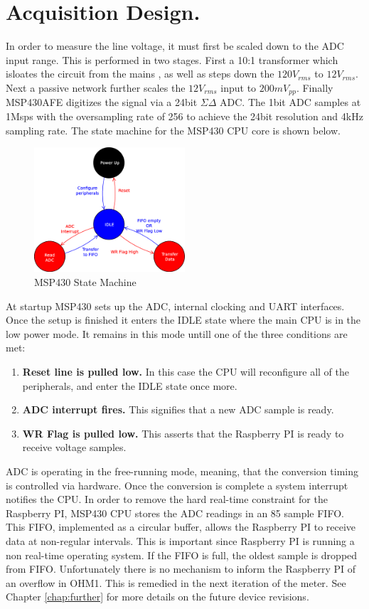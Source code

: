 \section{Acquisition Design.}
In order to measure the line voltage, it must first be scaled down to the ADC input range. This is performed in two stages. First a 10:1 transformer which isloates the circuit from the mains
, as well as steps down the $120V_{rms}$ to $12V_{rms}$. Next a passive network further scales the $12V_{rms}$ input to $200mV_{pp}$. Finally MSP430AFE digitizes the signal via a 24bit $\Sigma\Delta$
ADC. The 1bit ADC samples at 1Msps with the oversampling rate of 256 to achieve the 24bit resolution and 4kHz sampling rate. The state machine for the MSP430 CPU core is shown below.
\begin{figure}[h!]
\centering
\includegraphics[width=0.5\textwidth]{img/MSP430StateMachine.eps}
\caption{MSP430 State Machine}
\end{figure}

	At startup MSP430 sets up the ADC, internal clocking and UART interfaces. Once the setup is finished it enters the IDLE state where the main CPU is in the low power mode. It remains in this mode
untill one of the three conditions are met:
\begin{enumerate}
\item \textbf{Reset line is pulled low.} In this case the CPU will reconfigure all of the peripherals, and enter the IDLE state once more.
\item \textbf{ADC interrupt fires.} This signifies that a new ADC sample is ready.
\item \textbf{WR Flag is pulled low.} This asserts that the Raspberry PI is ready to receive voltage samples.
\end{enumerate}
	
ADC is operating in the free-running mode, meaning, that the conversion timing is controlled via hardware. Once the conversion is complete a system interrupt notifies the CPU.
In order to remove the hard real-time constraint for the Raspberry PI, MSP430 CPU stores the ADC readings in an 85 sample FIFO. This FIFO, implemented as a circular buffer, 
allows the Raspberry PI to receive data at non-regular intervals. This is important since Raspberry PI is running a non real-time operating system. If the FIFO is full, the oldest sample
is dropped from FIFO. Unfortunately there is no mechanism to inform the Raspberry PI of an overflow in OHM1. This is remedied in the next iteration of the meter. See Chapter \ref{chap:further}
for more details on the future device revisions.

